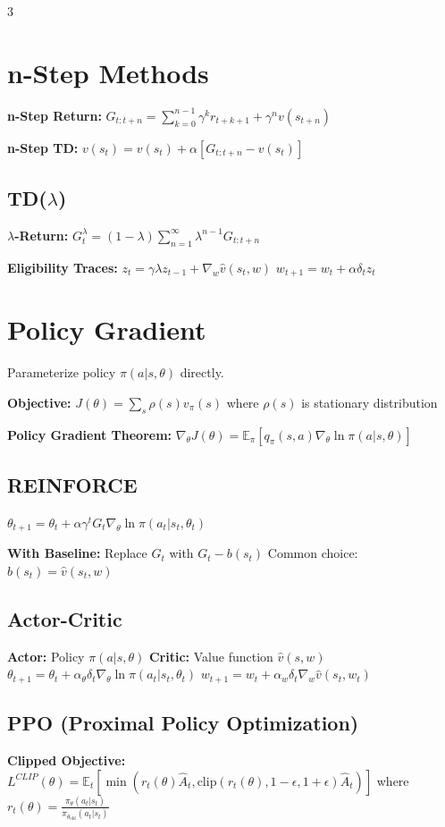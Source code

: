 \documentclass[8pt,landscape,a4paper]{article}
\begin{document}
\begin{multicols*}{3}
\section{n-Step Methods}
\textbf{n-Step Return:} $G_{t:t+n} = \sum_{k=0}^{n-1} \gamma^k r_{t+k+1} + \gamma^n v(s_{t+n})$

\textbf{n-Step TD:} $v(s_t) = v(s_t) + \alpha[G_{t:t+n} - v(s_t)]$

\subsection{TD($\lambda$)}
\textbf{$\lambda$-Return:} $G_t^\lambda = (1-\lambda) \sum_{n=1}^{\infty} \lambda^{n-1} G_{t:t+n}$

\textbf{Eligibility Traces:} $z_t = \gamma\lambda z_{t-1} + \nabla_w \hat{v}(s_t,w)$
$w_{t+1} = w_t + \alpha \delta_t z_t$

\section{Policy Gradient}
Parameterize policy $\pi(a|s,\theta)$ directly.

\textbf{Objective:} $J(\theta) = \sum_s \rho(s) v_\pi(s)$ where $\rho(s)$ is stationary distribution

\textbf{Policy Gradient Theorem:}
$\nabla_\theta J(\theta) = \mathbb{E}_\pi[q_\pi(s,a) \nabla_\theta \ln \pi(a|s,\theta)]$

\subsection{REINFORCE}
$\theta_{t+1} = \theta_t + \alpha \gamma^t G_t \nabla_\theta \ln \pi(a_t|s_t,\theta_t)$

\textbf{With Baseline:} Replace $G_t$ with $G_t - b(s_t)$
Common choice: $b(s_t) = \hat{v}(s_t,w)$

\subsection{Actor-Critic}
\textbf{Actor:} Policy $\pi(a|s,\theta)$
\textbf{Critic:} Value function $\hat{v}(s,w)$
$\theta_{t+1} = \theta_t + \alpha_\theta \delta_t \nabla_\theta \ln \pi(a_t|s_t,\theta_t)$
$w_{t+1} = w_t + \alpha_w \delta_t \nabla_w \hat{v}(s_t,w_t)$

\subsection{PPO (Proximal Policy Optimization)}
\textbf{Clipped Objective:} $L^{CLIP}(\theta) = \mathbb{E}_t[\min(r_t(\theta)\hat{A}_t, \text{clip}(r_t(\theta), 1-\epsilon, 1+\epsilon)\hat{A}_t)]$
where $r_t(\theta) = \frac{\pi_\theta(a_t|s_t)}{\pi_{\theta_{\text{old}}}(a_t|s_t)}$


\end{multicols*}
\end{document}
